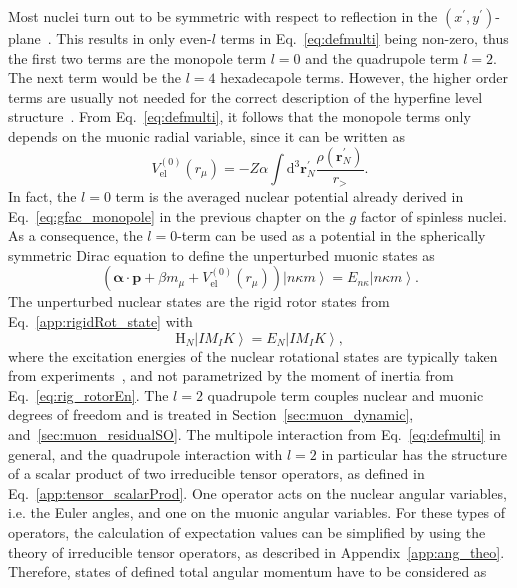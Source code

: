 Most nuclei turn out to be symmetric with respect to reflection in the $(x^\prime ,y^\prime)$-plane~\cite{zickendraht1991}. This results in only even-$l$ terms in Eq.~\eqref{eq:defmulti} being non-zero, thus the first two terms are the monopole term $l=0$ and the quadrupole term $l=2$. The next term would be the $l=4$ hexadecapole terms. However, the higher order terms are usually not needed for the correct description of the hyperfine level structure~\cite{BorieRinker1982}. From Eq.~\eqref{eq:defmulti}, it follows that the monopole terms only depends on the muonic radial variable, since it can be written as
\begin{equation}
V_{\text{el}}^{(0)}(r_\mu)=-Z\alpha \int\text{d}^3\mathbf{r}_N^\prime \frac{\rho(\mathbf{r}_N^\prime)}{r_>}.
\end{equation}
In fact, the $l=0$ term is the averaged nuclear potential already derived in Eq.~\eqref{eq:gfac_monopole} in the previous chapter on the $g$ factor of spinless nuclei. As a consequence, the $l=0$-term can be used as a potential in the spherically symmetric Dirac equation to define the unperturbed muonic states as
\begin{equation}
\label{eq:muonicEn}
\left(\boldsymbol{\alpha} \cdot \mathbf{p} + \beta m_\mu + V_{\text{el}}^{(0)}(r_\mu) \right) \left|n\kappa m\right> = E_{n\kappa}\left|n\kappa m\right>.
\end{equation}
The unperturbed nuclear states are the rigid rotor states from Eq.~\eqref{app:rigidRot_state} with
\begin{equation}
\label{eq:nuclEn}
\text{H}_N \left|IM_IK\right> = E_N \left|IM_IK\right>,
\end{equation}
where the excitation energies of the nuclear rotational states are typically taken from experiments~\cite{ENSDF}, and not parametrized by the moment of inertia from Eq.~\eqref{eq:rig_rotorEn}.
The $l=2$ quadrupole term couples nuclear and muonic degrees of freedom and is treated in Section~\ref{sec:muon_dynamic}, and~\ref{sec:muon_residualSO}. The multipole interaction from Eq.~\eqref{eq:defmulti} in general, and the quadrupole interaction with $l=2$ in particular has the structure of a scalar product of two irreducible tensor operators, as defined in Eq.~\eqref{app:tensor_scalarProd}. One operator acts on the nuclear angular variables, i.e. the Euler angles, and one on the muonic angular variables.
For these types of operators, the calculation of expectation values can be simplified by using the theory of irreducible tensor operators, as described in Appendix~\ref{app:ang_theo}. Therefore, states of defined total angular momentum have to be considered as
